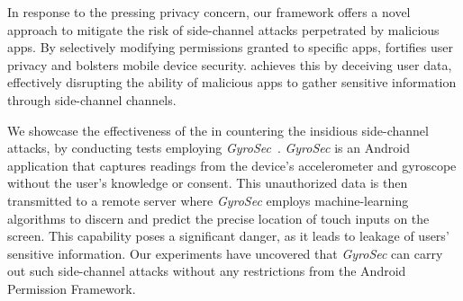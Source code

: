 In response to the pressing privacy concern, our framework offers a novel approach to mitigate the risk of side-channel attacks perpetrated by malicious apps. By selectively modifying permissions granted to specific apps, \framework{} fortifies user privacy and bolsters mobile device security. \framework{} achieves this by deceiving user data, effectively disrupting the ability of malicious apps to gather sensitive information through side-channel channels.

We showcase the effectiveness of the \framework{} in countering the insidious side-channel attacks, by conducting tests employing \textit{GyroSec}~\cite{lin2019motion}. \textit{GyroSec} is an Android application that captures readings from the device's accelerometer and gyroscope without the user's knowledge or consent. This unauthorized data is then transmitted to a remote server where \textit{GyroSec} employs machine-learning algorithms to discern and predict the precise location of touch inputs on the screen. This capability poses a significant danger, as it leads to leakage of users' sensitive information. Our experiments have uncovered that \textit{GyroSec} can carry out such side-channel attacks without any restrictions from the Android Permission Framework.


